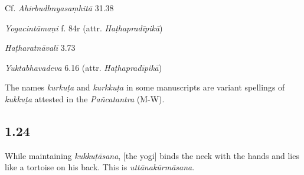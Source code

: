 \begin{ekdosis}
\begin{sources}[hp01_023]
Cf. \emph{Ahirbudhnyasaṃhitā} 31.38

\begin{versinnote}
\end{versinnote}

\end{sources}

\begin{testimonia}[hp01_023]
\emph{Yogacintāmaṇi} f. 84r (attr. \emph{Haṭhapradīpikā})

\begin{versinnote}
\end{versinnote}

\emph{Haṭharatnāvalī} 3.73

\begin{versinnote}
\end{versinnote}

\emph{Yuktabhavadeva} 6.16 (attr. \emph{Haṭhapradīpikā})

\begin{versinnote}
\end{versinnote}


\end{testimonia}

\begin{philcomm}[hp01_023]
The names \emph{kurkuṭa} and \emph{kurkkuṭa} in some manuscripts are variant spellings of \emph{kukkuṭa} attested in the \emph{Pañcatantra} (M-W).
\end{philcomm}

\subsection*{1.24}
\begin{translation}[hp01_024]
While maintaining \emph{kukkuṭāsana}, [the yogi] binds the neck with the hands and lies like a tortoise on his back. This is \emph{uttānakūrmāsana}.
\end{translation}


\end{ekdosis}
